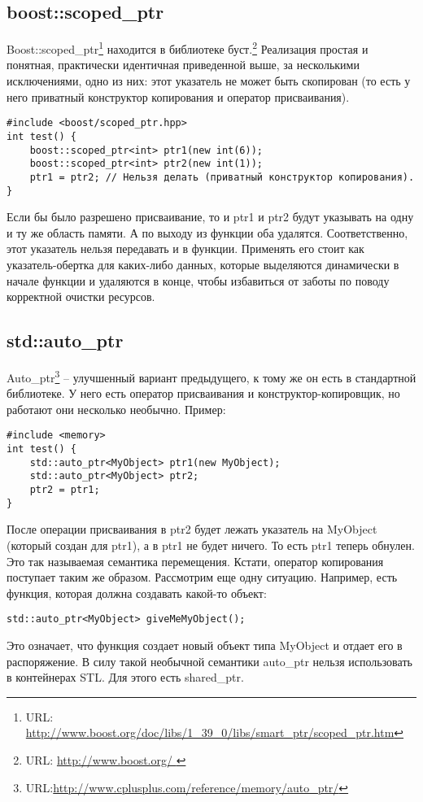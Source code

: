 \subsection{ boost::scoped\_ptr}

Boost::scoped\_ptr\footnote{URL: \url{http://www.boost.org/doc/libs/1_39_0/libs/smart_ptr/scoped_ptr.htm}} находится в библиотеке буст.\footnote{URL: \url{http://www.boost.org/ }}
Реализация простая и понятная, практически идентичная приведенной выше, за несколькими исключениями, одно из них: этот указатель не может быть скопирован (то есть у него приватный конструктор копирования и оператор присваивания). 

\begin{lstlisting}
#include <boost/scoped_ptr.hpp>
int test() {
    boost::scoped_ptr<int> ptr1(new int(6));
    boost::scoped_ptr<int> ptr2(new int(1));    
    ptr1 = ptr2; // Нельзя делать (приватный конструктор копирования).
}
\end{lstlisting}

Если бы было разрешено присваивание, то и ptr1 и ptr2 будут указывать на одну и ту же область памяти. А по выходу из функции оба удалятся. Соответственно, этот указатель нельзя передавать и в функции. Применять его стоит как указатель-обертка для каких-либо данных, которые выделяются динамически в начале функции и удаляются в конце, чтобы избавиться от заботы по поводу корректной очистки ресурсов.

\subsection{std::auto\_ptr}

Auto\_ptr\footnote{URL:\url{http://www.cplusplus.com/reference/memory/auto_ptr/}} -- улучшенный вариант предыдущего, к тому же он есть в стандартной библиотеке. У него есть оператор присваивания и конструктор-копировщик, но работают они несколько необычно.
Пример:

\begin{lstlisting}
#include <memory>
int test() {
    std::auto_ptr<MyObject> ptr1(new MyObject);
    std::auto_ptr<MyObject> ptr2;    
    ptr2 = ptr1;
}
\end{lstlisting}

После операции присваивания в ptr2 будет лежать указатель на MyObject (который создан для ptr1), а в ptr1 не будет ничего. То есть ptr1 теперь обнулен. Это так называемая семантика перемещения. Кстати, оператор копирования поступает таким же образом.
Рассмотрим еще одну ситуацию. Например, есть функция, которая должна создавать какой-то объект:
\begin{lstlisting}
std::auto_ptr<MyObject> giveMeMyObject();
\end{lstlisting}
Это означает, что функция создает новый объект типа MyObject и отдает его в распоряжение. В силу такой необычной семантики auto\_ptr нельзя использовать в контейнерах STL. Для этого есть shared\_ptr.


